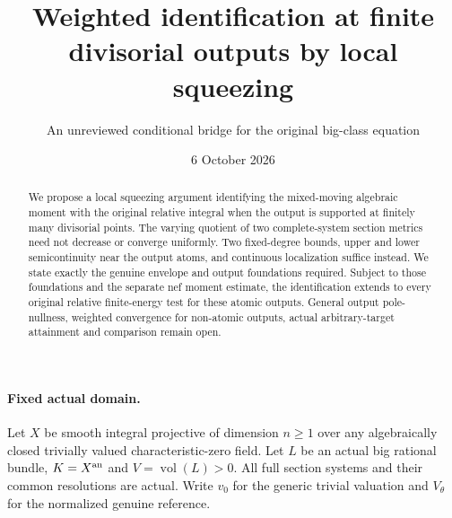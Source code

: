 \documentclass[10pt]{article}
\title{Weighted identification at finite divisorial outputs by local squeezing}
\author{An unreviewed conditional bridge for the original big-class equation}
\date{6 October 2026}
\newcommand{\vol}{\operatorname{vol}}
\begin{document}
\maketitle
\begin{abstract}
We propose a local squeezing argument identifying the mixed-moving
algebraic moment with the original relative integral when the output is
supported at finitely many divisorial points. The varying quotient of two
complete-system section metrics need not decrease or converge uniformly.
Two fixed-degree bounds, upper and lower semicontinuity near the output
atoms, and continuous localization suffice instead. We state exactly the
genuine envelope and output foundations required. Subject to those
foundations and the separate nef moment estimate, the identification
extends to every original relative finite-energy test for these atomic
outputs. General output pole-nullness, weighted convergence for non-atomic
outputs, actual arbitrary-target attainment and comparison remain open.
\end{abstract}

\paragraph{Fixed actual domain.}
Let $X$ be smooth integral projective of dimension $n\ge1$ over any
algebraically closed trivially valued characteristic-zero field.
Let $L$ be an actual big rational bundle, $K=X^{\rm an}$ and
$V=\vol(L)>0$. All full section systems and their common resolutions
are actual. Write $v_0$ for the generic trivial valuation and
$V_\theta$ for the normalized genuine reference.
\end{document}
